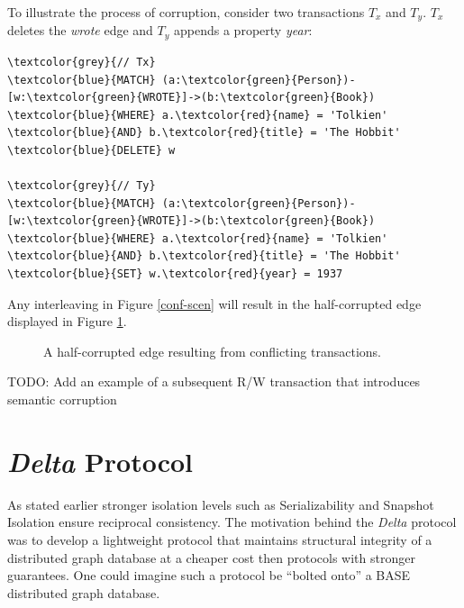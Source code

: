\documentclass[sigplan,10pt]{acmart}
\begin{document}
To illustrate the process of corruption, consider two transactions $T_x$ and $T_y$. $T_x$ deletes the \emph{wrote} edge and $T_y$ appends a property \emph{year}:
\begin{Verbatim}[commandchars=\\\{\},fontsize=\small,xleftmargin=.2in]
\textcolor{grey}{// Tx}
\textcolor{blue}{MATCH} (a:\textcolor{green}{Person})-[w:\textcolor{green}{WROTE}]->(b:\textcolor{green}{Book})
\textcolor{blue}{WHERE} a.\textcolor{red}{name} = 'Tolkien' \textcolor{blue}{AND} b.\textcolor{red}{title} = 'The Hobbit'
\textcolor{blue}{DELETE} w

\textcolor{grey}{// Ty}
\textcolor{blue}{MATCH} (a:\textcolor{green}{Person})-[w:\textcolor{green}{WROTE}]->(b:\textcolor{green}{Book})
\textcolor{blue}{WHERE} a.\textcolor{red}{name} = 'Tolkien' \textcolor{blue}{AND} b.\textcolor{red}{title} = 'The Hobbit'
\textcolor{blue}{SET} w.\textcolor{red}{year} = 1937
\end{Verbatim}
Any interleaving in Figure \ref{conf-scen} will result in the half-corrupted edge displayed in Figure \ref{half-corrupted}.

\begin{figure}[H]
  \centering
  \caption{A half-corrupted edge resulting from conflicting transactions.}
  \label{half-corrupted}
\end{figure}

TODO: Add an example of a subsequent R/W transaction that introduces semantic corruption

\section{\emph{Delta} Protocol}

As stated earlier stronger isolation levels such as Serializability and Snapshot Isolation ensure reciprocal consistency. The motivation behind the \emph{Delta} protocol was to develop a lightweight protocol that maintains structural integrity of a distributed graph database at a cheaper cost then protocols with stronger guarantees. One could imagine such a protocol be ``bolted onto'' a BASE distributed graph database.
\end{document}
